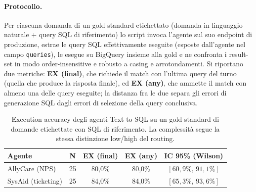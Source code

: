 \paragraph{Protocollo.} Per ciascuna domanda di un gold standard etichettato (domanda in linguaggio naturale + query SQL di riferimento) lo script invoca l'agente sul suo 
endpoint di produzione, estrae le query SQL effettivamente eseguite (esposte dall'agente nel campo \texttt{queries}),
le esegue su BigQuery insieme alla gold e ne confronta i result-set in modo order-insensitive e robusto a casing e arrotondamenti. 
Si riportano due metriche: \textbf{EX (final)}, che richiede il match con l'ultima query del turno (quella che produce la risposta finale), ed \textbf{EX (any)}, 
che ammette il match con almeno una delle query eseguite; la distanza fra le due separa gli errori di generazione SQL dagli errori di selezione della query conclusiva.

\begin{table}[htbp]
  \centering
  \caption[Execution accuracy degli agenti Text-to-SQL]{Execution accuracy degli agenti Text-to-SQL su un gold standard di domande etichettate con SQL di riferimento. La complessità segue la stessa distinzione low/high del routing.}
  \label{tab:eval-text2sql}
  \begin{tabular}{lcccc}
    \toprule
    \textbf{Agente} & \textbf{N} & \textbf{EX (final)} & \textbf{EX (any)} & \textbf{IC 95\% (Wilson)} \\
    \midrule
    AllyCare (NPS)      & 25 & 80{,}0\% & 80{,}0\% & $[60{,}9\% ,\, 91{,}1\%]$ \\
    SysAid (ticketing)  & 25 & 84{,}0\% & 84{,}0\% & $[65{,}3\% ,\, 93{,}6\%]$ \\
    \bottomrule
  \end{tabular}
\end{table}

